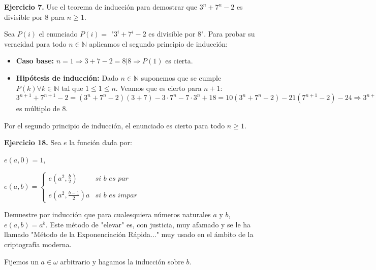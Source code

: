\documentclass[a4papper, 11pt]{article}
\begin{document}
\begin{flushleft}
	
	\textbf{Ejercicio 7.} Use el teorema de inducción para demostrar que $3^{n} + 7^{n} -2$ es divisible por $8$ para $n \ge 1$. \newline
	
	Sea $P(i)$ el enunciado $P(i) = $ "$3^{i} + 7^{i} -2$ es divisible por $8$". Para probar su veracidad para todo $n \in \mathbb{N}$ aplicamos el segundo principio de inducción: \newline
	
	\begin{itemize}
		\item \textbf{Caso base:} $n=1 \Rightarrow 3+7-2 = 8 | 8 \Rightarrow P(1)$ es cierta.
		\item \textbf{Hipótesis de inducción:} Dado $n \in \mathbb{N}$ suponemos que se cumple $P(k) \forall k \in \mathbb{N}$ tal que $1 \leq 1 \leq n$. Veamos que es cierto para $n+1$: \newline
		$3^{n+1} + 7^{n+1} -2 = (3^{n} + 7^{n} -2) (3+7) -3\cdot7^{n} - 7\cdot3^{n} + 18 = 10(3^{n} + 7^{n} -2) -21(7^{n+1} -2) -24 \Rightarrow 3^{n+1} + 7^{n+1} -2$ es múltiplo de $8$.
	\end{itemize}
	Por el segundo principio de inducción, el enunciado es cierto para todo $n \ge 1$. \newline
	
	\textbf{Ejercicio 18.} Sea $e$ la función dada por: \newline
	
	\hfil $e(a,0) = 1$,\newline
	
	\hfil     $e(a,b)=  \left\{ \begin{array}{lcc}
							  e(a^{2}, \frac{b}{2}) & \textit{si } b \textit{ es par} \\
							  \\  e(a^{2}, \frac{b-1}{2})a & \textit{si } b \textit{ es impar}
							\end{array}
						\right. $ \newline

    Demuestre por inducción que para cualesquiera números naturales $a$ y $b$, $e(a,b) = a^{b}$. Este método de "elevar" es, con justicia, muy afamado y se le ha llamado "Método de la Exponenciación Rápida..." muy usado en el ámbito de la criptografía moderna. \newline
    
    Fijemos un $a \in \omega$ arbitrario y hagamos la inducción sobre $b$. \newline
    

\end{flushleft}
\end{document}
